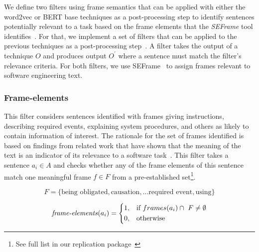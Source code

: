 We define two filters using frame semantics that can be
applied with either the word2vec or BERT base techniques as
 a post-processing step to identify sentences potentially relevant to a task based on the frame elements that the \textit{SEFrame} tool identifies~\cite{marques2020}.
For that, we implement a set of filters that can be applied to the previous techniques as a post-processing step~\cite{Manning2009IR}.
A filter takes the output of a technique $O$ and produces output $O^{\prime}$ where a sentence must match the filter's relevance criteria. For both filters, we use SEFrame~\cite{marques2021} to assign frames relevant to
software engineering text.





\subsubsection{Frame-elements}

This filter considers sentences identified with
frames giving instructions, describing required events, explaining system procedures, and others as
 likely to contain information of interest. The rationale for
 the set of frames identified is based on findings from related work that have shown that 
the meaning of the text is an indicator of its relevance to a software task~\cite{marques2020}.
This filter takes a sentence $a_i \in A$ and checks whether any of the frame elements
of this sentence match one meaningful frame $f \in F$ from a pre-established set\footnote{\label{full-list}See full list in our replication package~\cite{supplementary_material}}. 

\begin{small}
\begin{equation}
F = \{ \text{being obligated}, \text{causation}, \dots \text{required event}, \text{using} \} 
\end{equation}

\begin{equation}
\text{\textit{frame-elements}}(a_i) = \left \{
\begin{aligned}
    &1, && \text{if}\ frames(a_i) \cap ~F \ne \emptyset \\
    &0, && \text{otherwise}
\end{aligned} \right.
\end{equation} 
\end{small}


